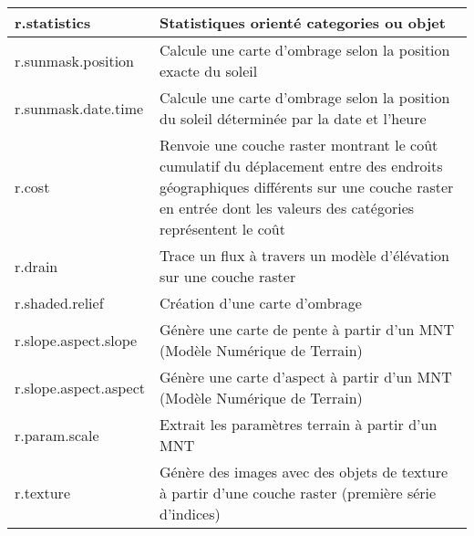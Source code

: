 \begin{table}[H]
{\begin{longtable}{|p{4cm}|p{10cm}|}
  \hline r.statistics & Statistiques orienté categories ou objet\\
  \hline r.sunmask.position & Calcule une carte d'ombrage selon la position exacte du soleil \\  
  \hline r.sunmask.date.time & Calcule une carte d'ombrage selon la position du soleil déterminée par la date et l'heure \\  
  \hline r.cost & Renvoie une couche raster montrant le coût cumulatif du déplacement entre des endroits géographiques différents sur une couche raster en entrée dont les valeurs des catégories représentent le coût\\
  \hline r.drain & Trace un flux à travers un modèle d'élévation sur une couche raster\\
  \hline r.shaded.relief & Création d'une carte d'ombrage \\
  \hline r.slope.aspect.slope & Génère une carte de pente à partir d'un MNT (Modèle Numérique de Terrain) \\
  \hline r.slope.aspect.aspect & Génère une carte d'aspect à partir d'un MNT (Modèle Numérique de Terrain) \\
  \hline r.param.scale & Extrait les paramètres terrain à partir d'un MNT \\
  \hline r.texture & Génère des images avec des objets de texture à partir d'une couche raster (première série d'indices)\\

\end{longtable}}
\end{table}
